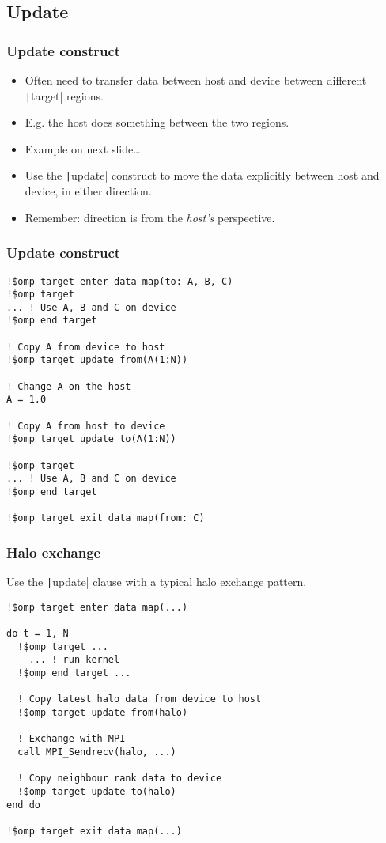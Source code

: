 \documentclass[aspectratio=169]{beamer}
\begin{document}
\subsection{Update}
\begin{frame}
\frametitle{Update construct}
\begin{itemize}
  \item Often need to transfer data between host and device between different \texttt|target| regions.
  \item E.g. the host does something between the two regions.
  \item Example on next slide\dots
  \item Use the \texttt|update| construct to move the data explicitly between host and device, in either direction.
  \item Remember: direction is from the \emph{host's} perspective.
\end{itemize}
\end{frame}

\begin{frame}[fragile]
\frametitle{Update construct}
\begin{verbatim}
!$omp target enter data map(to: A, B, C)
!$omp target
... ! Use A, B and C on device
!$omp end target

! Copy A from device to host
!$omp target update from(A(1:N))

! Change A on the host
A = 1.0

! Copy A from host to device
!$omp target update to(A(1:N))

!$omp target
... ! Use A, B and C on device
!$omp end target

!$omp target exit data map(from: C)
\end{verbatim}

\end{frame}

\begin{frame}[fragile]
\frametitle{Halo exchange}
Use the \texttt|update| clause with a typical halo exchange pattern.

\begin{verbatim}
!$omp target enter data map(...)

do t = 1, N
  !$omp target ...
    ... ! run kernel
  !$omp end target ...

  ! Copy latest halo data from device to host
  !$omp target update from(halo)

  ! Exchange with MPI
  call MPI_Sendrecv(halo, ...)

  ! Copy neighbour rank data to device
  !$omp target update to(halo)
end do

!$omp target exit data map(...)
\end{verbatim}

\end{frame}
\end{document}
